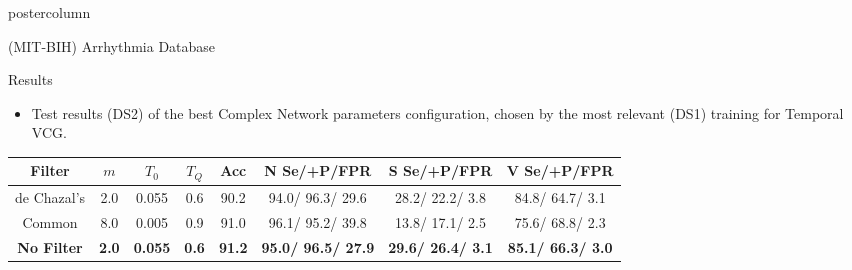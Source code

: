 \documentclass[final,hyperref={pdfpagelabels=false}]{beamer}
\begin{document}
\begin{frame}
\begin{columns}
\begin{column}{.5\textwidth}
\begin{beamercolorbox}[center,wd=\textwidth]{postercolumn}
\begin{minipage}[T]{.98\textwidth}
{\begin{block}{(MIT-BIH) Arrhythmia Database}
\begin{itemize}
						\end{itemize}
            	
            	
            	
            \end{block}

\vfill          
            
            \vfill
            	\begin{block}{Results}
            		\begin{itemize}
            			\item Test results (DS2) of the best Complex Network parameters configuration, chosen by the most relevant (DS1) training for Temporal VCG.
            		\end{itemize}      		
            		
            		{\small
            			
            			\begin{table}[h!]
            				
            				\begin{center}
            					
            					\label{tab:results3d} 
            					\centering	
            					\begin{tabular}{|c|c|c|c|c|c|c|c|} 
            						\hline 
            						Filter & $m$ & $T_0$ & $T_Q$ & Acc & N Se/+P/FPR & S Se/+P/FPR & V Se/+P/FPR   \\ \hline \hline
            						de Chazal's & 2.0 & 0.055  & 0.6 &90.2 &   94.0/  96.3/  29.6 &   28.2/  22.2/   3.8 &   84.8/  64.7/   3.1   \\ \hline			
            						Common   & 8.0 & 0.005 & 0.9 &   91.0 &   96.1/  95.2/  39.8 &   13.8/  17.1/   2.5 &   75.6/  68.8/   2.3 \\ 			\hline
            						\textbf{No Filter}& \textbf{2.0} & \textbf{0.055} & \textbf{0.6} &  \textbf{91.2} &   \textbf{95.0/  96.5/  27.9} &  \textbf{ 29.6/  26.4/   3.1} &   \textbf{85.1/  66.3/   3.0} \\             	\hline \hline 
            					\end{tabular}
            					\vspace{0.05cm}
            					\linebreak 
            					
%            							
            					

\end{center}
\end{table}}
\end{block}}
\end{minipage}
\end{beamercolorbox}
\end{column}
\end{columns}
\end{frame}
\end{document}
